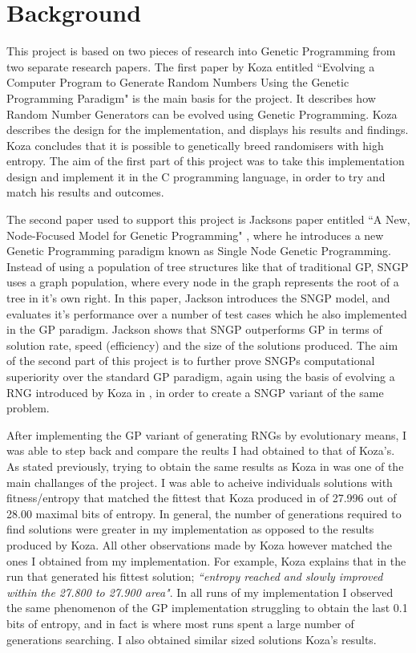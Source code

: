 \documentclass[a4paper,10.5pt]{article}
\begin{document}
\section{Background}
This project is based on two pieces of research into Genetic Programming from two separate research papers. The first paper by Koza entitled ``Evolving a Computer Program to Generate Random Numbers Using the Genetic Programming Paradigm" is the main basis for the project. It describes how Random Number Generators can be evolved using Genetic Programming. Koza describes the design for the implementation, and displays his results and findings. Koza concludes that it is possible to genetically breed randomisers with high entropy. The aim of the first part of this project was to take this implementation design and implement it in the C programming language, in order to try and match his results and outcomes. 

The second paper used to support this project is Jacksons paper entitled ``A New, Node-Focused Model for Genetic Programming" \cite{jacksonsngp}, where he introduces a new Genetic Programming paradigm known as Single Node Genetic Programming. Instead of using a population of tree structures like that of traditional GP, SNGP uses a graph population, where every node in the graph represents the root of a tree in it's own right. In this paper, Jackson introduces the SNGP model, and evaluates it's performance over a number of test cases which he also implemented in the GP paradigm. Jackson shows that SNGP outperforms GP in terms of solution rate, speed (efficiency) and the size of the solutions produced. The aim of the second part of this project is to further prove SNGPs computational superiority over the standard GP paradigm, again using the basis of evolving a RNG introduced by Koza in \cite{kozarng}, in order to create a SNGP variant of the same problem.

After implementing the GP variant of generating RNGs by evolutionary means, I was able to step back and compare the reults I had obtained to that of Koza's. As stated previously, trying to obtain the same results as Koza in \cite{kozarng} was one of the main challanges of the project. I was able to acheive individuals solutions with fitness/entropy that matched the fittest that Koza produced in \cite[p.6]{kozarng} of 27.996 out of 28.00 maximal bits of entropy. In general, the number of generations required to find solutions were greater in my implementation as opposed to the results produced by Koza. All other observations made by Koza however matched the ones I obtained from my implementation. For example, Koza explains that in the run that generated his fittest solution; \emph{``entropy reached and slowly improved within the 27.800 to 27.900 area"}. In all runs of my implementation I observed the same phenomenon of the GP implementation struggling to obtain the last 0.1 bits of entropy, and in fact is where most runs spent a large number of generations searching. I also obtained similar sized solutions Koza's results.
\end{document}

